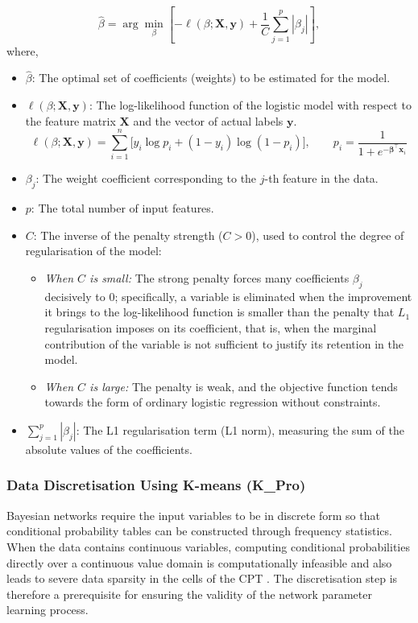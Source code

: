 \vspace{1em}
\begin{equation}
    \hat{\beta} = \arg\min_{\beta} \left[ -\ell(\beta; \mathbf{X}, \mathbf{y}) + \frac{1}{C} \sum_{j=1}^{p} |\beta_j| \right],
\end{equation}
\noindent
where,
\begin{itemize}
    \item $\hat{\beta}$: The optimal set of coefficients (weights) to be estimated for the model.
    \item $\ell(\beta; \mathbf{X}, \mathbf{y})$: The log-likelihood function of the logistic model with respect to the feature matrix $\mathbf{X}$ and the vector of actual labels $\mathbf{y}$. 
    \begin{equation}
        \ell(\beta; \mathbf{X}, \mathbf{y}) = \sum_{i=1}^{n} \Big[ y_i \log p_i + (1 - y_i) \log (1 - p_i) \Big], \qquad p_i = \frac{1}{1 + e^{-\boldsymbol{\beta}^\top \mathbf{x}_i}}
    \end{equation}
    \item $\beta_j$: The weight coefficient corresponding to the $j$-th feature in the data.
    \item $p$: The total number of input features.
    \item $C$: The inverse of the penalty strength ($C > 0$), used to control the degree of regularisation of the model:
    \begin{itemize}
        \item \textit{When $C$ is small:} The strong penalty forces many coefficients $\beta_j$ decisively to $0$; specifically, a variable is eliminated when the improvement it brings to the log-likelihood function is smaller than the penalty that $L_1$ regularisation imposes on its coefficient, that is, when the marginal contribution of the variable is not sufficient to justify its retention in the model.
        \item \textit{When $C$ is large:} The penalty is weak, and the objective function tends towards the form of ordinary logistic regression without constraints.
    \end{itemize}
    \item $\sum_{j=1}^{p} |\beta_j|$: The L1 regularisation term (L1 norm), measuring the sum of the absolute values of the coefficients.
\end{itemize}

\subsubsection{Data Discretisation Using K-means (K\_Pro)}
\label{sec: 3.1.3}
\noindent
Bayesian networks require the input variables to be in discrete form so that conditional probability tables can be constructed through frequency statistics. When the data contains continuous variables, computing conditional probabilities directly over a continuous value domain is computationally infeasible and also leads to severe data sparsity in the cells of the CPT \cite{koller2009probabilistic}\cite{friedman1996discretizing}. The discretisation step is therefore a prerequisite for ensuring the validity of the network parameter learning process.

